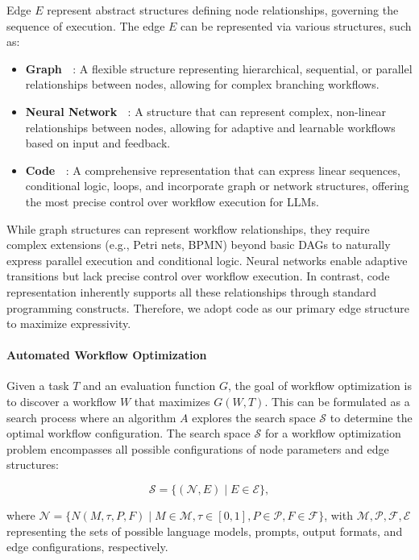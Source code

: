 \documentclass{article} %
\theoremstyle{plain}
\theoremstyle{definition}
\theoremstyle{remark}
\begin{document}
Edge \( E \) represent abstract structures defining node relationships, governing the sequence of execution. The edge \( E \) can be represented via various structures, such as:

\begin{itemize}[leftmargin=20pt]
    \item \textbf{Graph ~\cite{zhuge2024gptswarm}}: A flexible structure representing hierarchical, sequential, or parallel relationships between nodes, allowing for complex branching workflows.
    \item \textbf{Neural Network ~\citep{liu2023dynamic}}: A structure that can represent complex, non-linear relationships between nodes, allowing for adaptive and learnable workflows based on input and feedback.
    \item \textbf{Code ~\citep{hu2024automated}}: A comprehensive representation that can express linear sequences, conditional logic, loops, and incorporate graph or network structures, offering the most precise control over workflow execution for LLMs.
\end{itemize}

While graph structures can represent workflow relationships, they require complex extensions (e.g., Petri nets, BPMN) beyond basic DAGs to naturally express parallel execution and conditional logic. Neural networks enable adaptive transitions but lack precise control over workflow execution. In contrast, code representation inherently supports all these relationships through standard programming constructs. Therefore, we adopt code as our primary edge structure to maximize expressivity.

\paragraph{Automated Workflow Optimization}
Given a task \( T \) and an evaluation function \( G \), the goal of workflow optimization is to discover a workflow \( W \) that maximizes \( G(W, T) \). This can be formulated as a search process where an algorithm \( A \) explores the search space \( \mathcal{S} \) to determine the optimal workflow configuration.
The search space \( \mathcal{S} \) for a workflow optimization problem encompasses all possible configurations of node parameters and edge structures:

\[
\mathcal{S} = \{ (\mathcal{N}, E) \mid  E \in \mathcal{E} \},
\]

where \( \mathcal{N} = \{ N(M, \tau, P, F) \mid M \in \mathcal{M}, \tau \in [0,1], P \in \mathcal{P}, F \in \mathcal{F} \} \), with \( \mathcal{M}, \mathcal{P}, \mathcal{F}, \mathcal{E} \) representing the sets of possible language models, prompts, output formats, and edge configurations, respectively.
\end{document}
